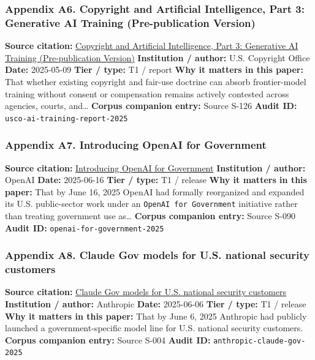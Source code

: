 \documentclass[
  american,
  11pt,
  letterpaper,
]{article}
\begin{document}
\subsubsection{Appendix A6. Copyright and Artificial Intelligence, Part
3: Generative AI Training (Pre-publication
Version)}\label{appendix-a6-copyright-and-artificial-intelligence-part-3-generative-ai-training-pre-publication-version}

\textbf{Source citation:}
\href{https://copyright.gov/ai/Copyright-and-Artificial-Intelligence-Part-3-Generative-AI-Training-Report-Pre-Publication-Version.pdf}{Copyright
and Artificial Intelligence, Part 3: Generative AI Training
(Pre-publication Version)} \textbf{Institution / author:} U.S. Copyright
Office \textbf{Date:} 2025-05-09 \textbf{Tier / type:} T1 / report
\textbf{Why it matters in this paper:} That whether existing copyright
and fair-use doctrine can absorb frontier-model training without consent
or compensation remains actively contested across agencies, courts,
and\ldots{} \textbf{Corpus companion entry:} Source S-126 \textbf{Audit
ID:} \texttt{usco-ai-training-report-2025}

\subsubsection{Appendix A7. Introducing OpenAI for
Government}\label{appendix-a7-introducing-openai-for-government}

\textbf{Source citation:}
\href{https://openai.com/global-affairs/introducing-openai-for-government/}{Introducing
OpenAI for Government} \textbf{Institution / author:} OpenAI
\textbf{Date:} 2025-06-16 \textbf{Tier / type:} T1 / release \textbf{Why
it matters in this paper:} That by June 16, 2025 OpenAI had formally
reorganized and expanded its U.S. public-sector work under an
\texttt{OpenAI\ for\ Government} initiative rather than treating
government use as\ldots{} \textbf{Corpus companion entry:} Source S-090
\textbf{Audit ID:} \texttt{openai-for-government-2025}

\subsubsection{Appendix A8. Claude Gov models for U.S. national security
customers}\label{appendix-a8-claude-gov-models-for-u-s-national-security-customers}

\textbf{Source citation:}
\href{https://www.anthropic.com/news/claude-gov-models-for-u-s-national-security-customers}{Claude
Gov models for U.S. national security customers} \textbf{Institution /
author:} Anthropic \textbf{Date:} 2025-06-06 \textbf{Tier / type:} T1 /
release \textbf{Why it matters in this paper:} That by June 6, 2025
Anthropic had publicly launched a government-specific model line for
U.S. national security customers. \textbf{Corpus companion entry:}
Source S-004 \textbf{Audit ID:} \texttt{anthropic-claude-gov-2025}
\end{document}
